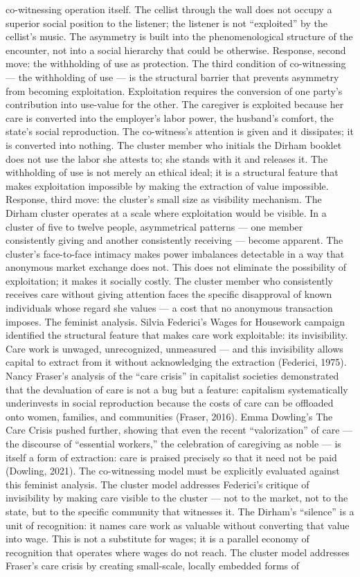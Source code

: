 co-witnessing operation itself. The cellist through the wall does not occupy a superior social position to the listener; the listener is not “exploited” by the cellist’s music. The asymmetry is built into the phenomenological structure of the encounter, not into a social hierarchy that could be otherwise. Response, second move: the withholding of use as protection. The third condition of co-witnessing — the withholding of use — is the structural barrier that prevents asymmetry from becoming exploitation. Exploitation requires the conversion of one party’s contribution into use-value for the other. The caregiver is exploited because her care is converted into the employer’s labor power, the husband’s comfort, the state’s social reproduction. The co-witness’s attention is given and it dissipates; it is converted into nothing. The cluster member who initials the Dirham booklet does not use the labor she attests to; she stands with it and releases it. The withholding of use is not merely an ethical ideal; it is a structural feature that makes exploitation impossible by making the extraction of value impossible. Response, third move: the cluster’s small size as visibility mechanism. The Dirham cluster operates at a scale where exploitation would be visible. In a cluster of five to twelve people, asymmetrical patterns — one member consistently giving and another consistently receiving — become apparent. The cluster’s face-to-face intimacy makes power imbalances detectable in a way that anonymous market exchange does not. This does not eliminate the possibility of exploitation; it makes it socially costly. The cluster member who consistently receives care without giving attention faces the specific disapproval of known individuals whose regard she values — a cost that no anonymous transaction imposes. The feminist analysis. Silvia Federici’s Wages for Housework campaign identified the structural feature that makes care work exploitable: its invisibility. Care work is unwaged, unrecognized, unmeasured — and this invisibility allows capital to extract from it without acknowledging the extraction (Federici, 1975). Nancy Fraser’s analysis of the “care crisis” in capitalist societies demonstrated that the devaluation of care is not a bug but a feature: capitalism systematically underinvests in social reproduction because the costs of care can be offloaded onto women, families, and communities (Fraser, 2016). Emma Dowling’s The Care Crisis pushed further, showing that even the recent “valorization” of care — the discourse of “essential workers,” the celebration of caregiving as noble — is itself a form of extraction: care is praised precisely so that it need not be paid (Dowling, 2021). The co-witnessing model must be explicitly evaluated against this feminist analysis. The cluster model addresses Federici’s critique of invisibility by making care visible to the cluster — not to the market, not to the state, but to the specific community that witnesses it. The Dirham’s “silence” is a unit of recognition: it names care work as valuable without converting that value into wage. This is not a substitute for wages; it is a parallel economy of recognition that operates where wages do not reach. The cluster model addresses Fraser’s care crisis by creating small-scale, locally embedded forms of 